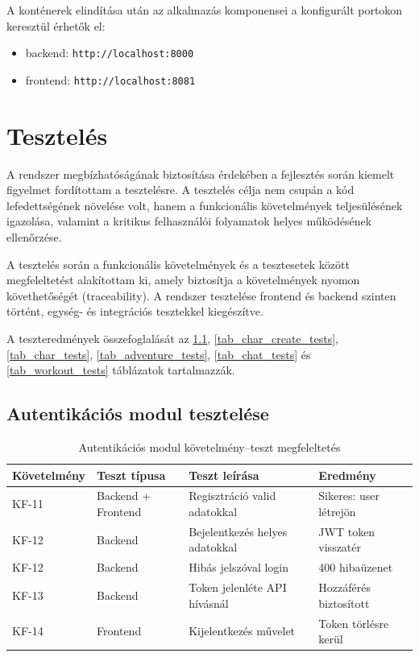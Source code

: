 \documentclass[
]{thesis-ekf}
\theoremstyle{definition}
\theoremstyle{remark}
\begin{document}
A konténerek elindítása után az alkalmazás komponensei a konfigurált portokon keresztül érhetők el:
\begin{itemize}
    \item backend: \texttt{http://localhost:8000}
    \item frontend: \texttt{http://localhost:8081}
\end{itemize}

\chapter{Tesztelés}

A rendszer megbízhatóságának biztosítása érdekében a fejlesztés során kiemelt figyelmet fordítottam a tesztelésre. A tesztelés célja nem csupán a kód lefedettségének növelése volt, hanem a funkcionális követelmények teljesülésének igazolása, valamint a kritikus felhasználói folyamatok helyes működésének ellenőrzése.

A tesztelés során a funkcionális követelmények és a tesztesetek között megfeleltetést alakítottam ki, amely biztosítja a követelmények nyomon követhetőségét (traceability). A rendszer tesztelése frontend és backend szinten történt, egység- és integrációs tesztekkel kiegészítve.

A teszteredmények összefoglalását az 
\ref{tab_auth_tests}, 
\ref{tab_char_create_tests}, 
\ref{tab_char_tests}, 
\ref{tab_adventure_tests}, 
\ref{tab_chat_tests} 
és \ref{tab_workout_tests} táblázatok tartalmazzák.

\section{Autentikációs modul tesztelése}

\begin{table}[h]
\centering
\begin{tabularx}{\textwidth}{|l|l|X|X|}
\hline
\textbf{Követelmény} & \textbf{Teszt típusa} & \textbf{Teszt leírása} & \textbf{Eredmény} \\ \hline
KF-11 & Backend + Frontend & Regisztráció valid adatokkal & Sikeres: user létrejön \\ \hline
KF-12 & Backend & Bejelentkezés helyes adatokkal & JWT token visszatér \\ \hline
KF-12 & Backend & Hibás jelszóval login & 400 hibaüzenet \\ \hline
KF-13 & Backend & Token jelenléte API hívásnál & Hozzáférés biztosított \\ \hline
KF-14 & Frontend & Kijelentkezés művelet & Token törlésre kerül \\ \hline
\end{tabularx}
\caption{Autentikációs modul követelmény–teszt megfeleltetés}
\label{tab_auth_tests}
\end{table}
\end{document}
